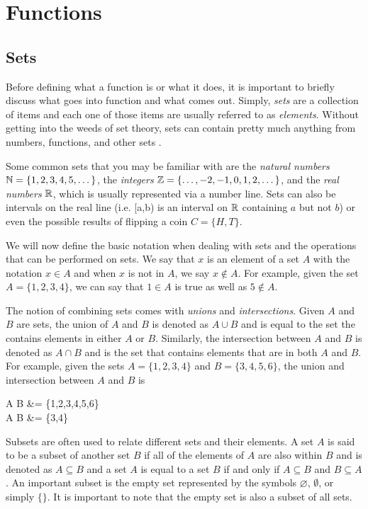 \chapter{Functions}

\section{Sets}
Before defining what a function is or what it does, it is important to briefly discuss what goes into function and what comes out. Simply, \textit{sets} are a collection of items and each one of those items are usually referred to as \textit{elements}. Without getting into the weeds of set theory, sets can contain pretty much anything from numbers, functions, and other sets \cite{bookofproof}.

Some common sets that you may be familiar with are the \textit{natural numbers} $\mathbb{N} = \{1,2,3,4,5,\dots\}$, the \textit{integers} $\mathbb{Z} = \{\dots,-2,-1,0,1,2,\dots\}$, and the \textit{real numbers} $\mathbb{R}$, which is usually represented via a number line. Sets can also be intervals on the real line (i.e. [a,b) is an interval on $\mathbb{R}$ containing $a$ but not $b$) or even the possible results of flipping a coin $C = \{H,T\}$.

We will now define the basic notation when dealing with sets and the operations that can be performed on sets. We say that $x$ is an element of a set $A$ with the notation $x \in A$ and when $x$ is not in $A$, we say $x \not\in A$. For example, given the set $A = \{1,2,3,4\}$, we can say that $1 \in A$ is true as well as $5 \not\in A$.

The notion of combining sets comes with \textit{unions} and \textit{intersections}. Given $A$ and $B$ are sets, the union of $A$ and $B$ is denoted as $A \cup B$ and is equal to the set the contains elements in either $A$ or $B$. Similarly, the intersection between $A$ and $B$ is denoted as $A \cap B$ and is the set that contains elements that are in both $A$ and $B$. For example, given the sets $A = \{1,2,3,4\}$ and $B = \{3,4,5,6\}$, the union and intersection between $A$ and $B$ is

\begin{aequation}
    A \cup B &= \{1,2,3,4,5,6\} \\
    A \cap B &= \{3,4\}
\end{aequation}

Subsets are often used to relate different sets and their elements. A set $A$ is said to be a subset of another set $B$ if all of the elements of $A$ are also within $B$ and is denoted as $A \subseteq B$ and a set $A$ is equal to a set $B$ if and only if $A \subseteq B$ and $B \subseteq A$. An important subset is the empty set represented by the symbols $\varnothing$, $\emptyset$, or simply $\{\}$. It is important to note that the empty set is also a subset of all sets.


